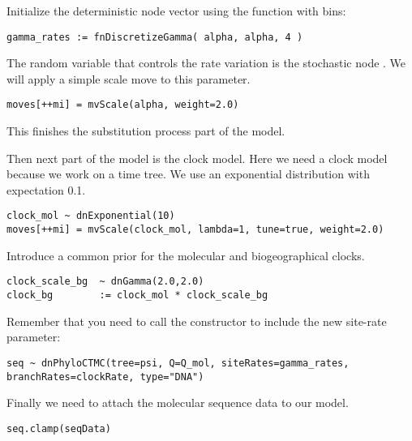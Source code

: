 Initialize the  deterministic node vector using the   function with  bins:
{\tt \begin{snugshade*}
\begin{lstlisting}
gamma_rates := fnDiscretizeGamma( alpha, alpha, 4 )
\end{lstlisting}
\end{snugshade*}}
The random variable that controls the rate variation is the stochastic node . 
We will apply a simple scale move to this parameter.
{\tt \begin{snugshade*}
\begin{lstlisting}
moves[++mi] = mvScale(alpha, weight=2.0)
\end{lstlisting}
\end{snugshade*}}
This finishes the substitution process part of the model.

Then next part of the model is the clock model. Here we need a clock model because we work on a time tree. We use an exponential distribution with expectation 0.1.
{\tt \begin{snugshade*}
\begin{lstlisting}
clock_mol ~ dnExponential(10)
moves[++mi] = mvScale(clock_mol, lambda=1, tune=true, weight=2.0)
\end{lstlisting}
\end{snugshade*}}

Introduce a common prior for the molecular and biogeographical clocks.
\begin{snugshade}
\begin{lstlisting}
clock_scale_bg  ~ dnGamma(2.0,2.0)
clock_bg        := clock_mol * clock_scale_bg
\end{lstlisting}
\end{snugshade}

Remember that you need to call the  constructor to include the new site-rate parameter:

{\tt \begin{snugshade*}
\begin{lstlisting}
seq ~ dnPhyloCTMC(tree=psi, Q=Q_mol, siteRates=gamma_rates, branchRates=clockRate, type="DNA")
\end{lstlisting}
\end{snugshade*}}
Finally we need to attach the molecular sequence data to our model.
{\tt \begin{snugshade*}
\begin{lstlisting}
seq.clamp(seqData)
\end{lstlisting}
\end{snugshade*}}

